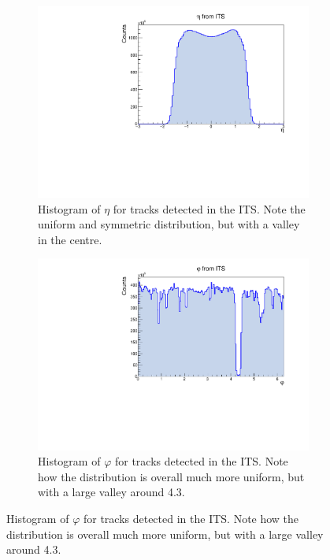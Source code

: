 \begin{figure}[H]%
    \centering
    \begin{subfigure}[t]{.49\linewidth}
        \centering
        \includegraphics[width=\linewidth]{Plots/pass4_TracksIU/eta.pdf}
        \caption{Histogram of $\eta$ for tracks detected in the ITS. Note the uniform and symmetric distribution, but with a valley in the centre.}
        \label{fig:ITS_eta}
    \end{subfigure}
    \hfill
    \begin{subfigure}[t]{.49\linewidth}
        \centering
        \includegraphics[width=\linewidth]{Plots/pass4_TracksIU/phi.pdf}
        \caption{Histogram of $\varphi$ for tracks detected in the ITS. Note how the distribution is overall much more uniform, but with a large valley around 4.3.}
        \label{fig:ITS_phi}

\end{subfigure}
\end{figure}
